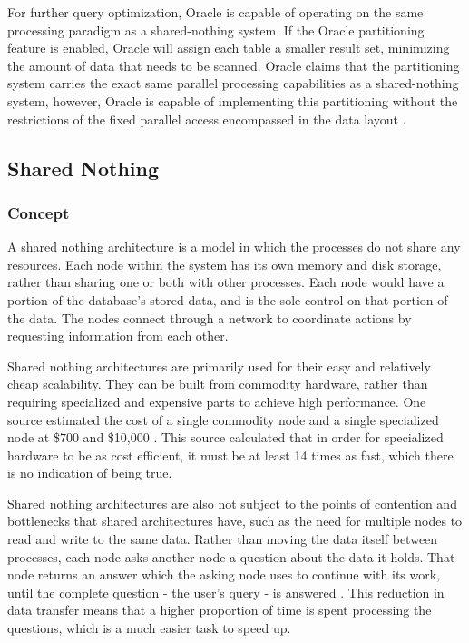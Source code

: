\documentclass[onecolumn, draftclsnofoot,10pt, compsoc]{IEEEtran}
\begin{document}
For further query optimization, Oracle is capable of operating on the same processing paradigm as a shared-nothing system.
If the Oracle partitioning feature is enabled, Oracle will assign each table a smaller result set, minimizing the amount of data that needs to be scanned. 
Oracle claims that the partitioning system carries the exact same parallel processing capabilities as a shared-nothing system, however, Oracle is capable of implementing this partitioning without the restrictions of the fixed parallel access encompassed in the data layout \cite{OraclePEwODF}.  

\subsection{Shared Nothing}
\subsubsection{Concept}
A shared nothing architecture is a model in which the processes do not share any resources. 
Each node within the system has its own memory and disk storage, rather than sharing one or both with other processes.
Each node would have a portion of the database’s stored data, and is the sole control on that portion of the data. 
The nodes connect through a network to coordinate actions by requesting information from each other. 

Shared nothing architectures are primarily used for their easy and relatively cheap scalability.
They can be built from commodity hardware, rather than requiring specialized and expensive parts to achieve high performance. 
One source estimated the cost of a single commodity node and a single specialized node at \$700 and \$10,000 \cite{HiPerf}. 
This source calculated that in order for specialized hardware to be as cost efficient, it must be at least 14 times as fast, which there is no indication of being true.

Shared nothing architectures are also not subject to the points of contention and bottlenecks that shared architectures have, such as the need for multiple nodes to read and write to the same data.
Rather than moving the data itself between processes, each node asks another node a question about the data it holds.
That node returns an answer which the asking node uses to continue with its work, until the complete question - the user’s query - is answered \cite{DeWittFuture}  .
This reduction in data transfer means that a higher proportion of time is spent processing the questions, which is a much easier task to speed up.
    
\end{document}
